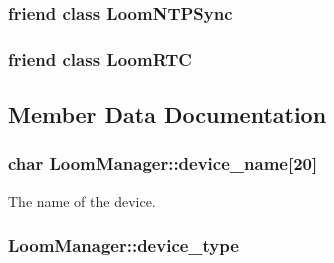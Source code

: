 \subsubsection[{\texorpdfstring{Loom\+N\+T\+P\+Sync}{LoomNTPSync}}]{\setlength{\rightskip}{0pt plus 5cm}friend class {\bf Loom\+N\+T\+P\+Sync}\hspace{0.3cm}{\ttfamily [friend]}}\hypertarget{class_loom_manager_ac23a5e689f21bc3c5dc04a499b9a905b}{}\label{class_loom_manager_ac23a5e689f21bc3c5dc04a499b9a905b}
\subsubsection[{\texorpdfstring{Loom\+R\+TC}{LoomRTC}}]{\setlength{\rightskip}{0pt plus 5cm}friend class {\bf Loom\+R\+TC}\hspace{0.3cm}{\ttfamily [friend]}}\hypertarget{class_loom_manager_ad460f63d437defbca6d2c4cf1b03f084}{}\label{class_loom_manager_ad460f63d437defbca6d2c4cf1b03f084}


\subsection{Member Data Documentation}
\subsubsection[{\texorpdfstring{device\+\_\+name}{device_name}}]{\setlength{\rightskip}{0pt plus 5cm}char Loom\+Manager\+::device\+\_\+name\mbox{[}20\mbox{]}\hspace{0.3cm}{\ttfamily [protected]}}\hypertarget{class_loom_manager_aac06e8c17477ab5d8991e782f9ffecca}{}\label{class_loom_manager_aac06e8c17477ab5d8991e782f9ffecca}


The name of the device. 

\subsubsection[{\texorpdfstring{device\+\_\+type}{device_type}}]{ Loom\+Manager\+::device\+\_\+type\hspace{0.3cm}{\ttfamily [protected]}}\hypertarget{class_loom_manager_af280305895cc3b2c5022d4a5fabeb2c4}{}\label{class_loom_manager_af280305895cc3b2c5022d4a5fabeb2c4}


